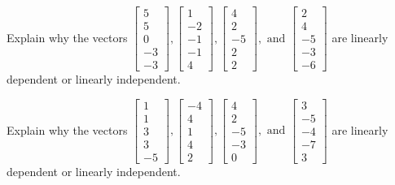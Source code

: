 \documentclass{article}
\begin{document}
\begin{exerciseStatement}
    Explain why the vectors \(\left[\begin{array}{r}
5 \\
5 \\
0 \\
-3 \\
-3
\end{array}\right] , \left[\begin{array}{r}
1 \\
-2 \\
-1 \\
-1 \\
4
\end{array}\right] , \left[\begin{array}{r}
4 \\
2 \\
-5 \\
2 \\
2
\end{array}\right] , \text{ and } \left[\begin{array}{r}
2 \\
4 \\
-5 \\
-3 \\
-6
\end{array}\right]\) are linearly dependent or linearly independent.


  
\end{exerciseStatement}

\begin{exerciseStatement}
    Explain why the vectors \(\left[\begin{array}{r}
1 \\
1 \\
3 \\
3 \\
-5
\end{array}\right] , \left[\begin{array}{r}
-4 \\
4 \\
1 \\
4 \\
2
\end{array}\right] , \left[\begin{array}{r}
4 \\
2 \\
-5 \\
-3 \\
0
\end{array}\right] , \text{ and } \left[\begin{array}{r}
3 \\
-5 \\
-4 \\
-7 \\
3
\end{array}\right]\) are linearly dependent or linearly independent.


  
\end{exerciseStatement}
\end{document}
